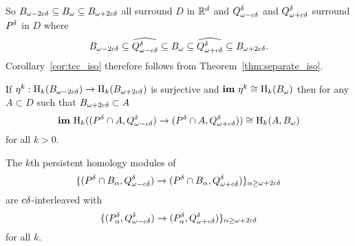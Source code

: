 So $\b\subseteq \B\subseteq \BB$ all surround $D$ in $\R^d$ and $\Q^\of$ and $\QQ^\of$ surround $P^\of$ in $D$ where
\[ \b\subseteq \widehat{\Q^\of}\subseteq \B\subseteq \widehat{\QQ^\of}\subseteq \BB.\]
Corollary~\ref{cor:tcc_iso} therefore follows from Theorem~\ref{thm:separate_iso}.

\begin{corollary}\label{cor:tcc_iso}
  If $\eta^k : \hom_k(\b)\to \hom_k(\BB)$ is surjective and $\im~\eta^k\cong \hom_k(\bb)$ then for any $A\subset D$ such that $\BB\subset A$
  \[ \im~\hom_k((\P\cap A, \Q^\of)\to (\P\cap A, \QQ^\of))\cong \hom_k(A, \bb)\]
  for all $k > 0$.
\end{corollary}

\begin{lemma}
  The $k$th persistent homology modules of
  \[\{(\P\cap B_\alpha, \Q^\of)\to (\P\cap B_\alpha, \QQ^\of)\}_{\alpha\geq\oo}\]
  are $c\of$-interleaved with
  \[ \{(P_\alpha^\of, \Q^\of)\to (P_\alpha^\of, \QQ^\of)\}_{\alpha\geq\oo} \]
  for all $k$.
\end{lemma}
